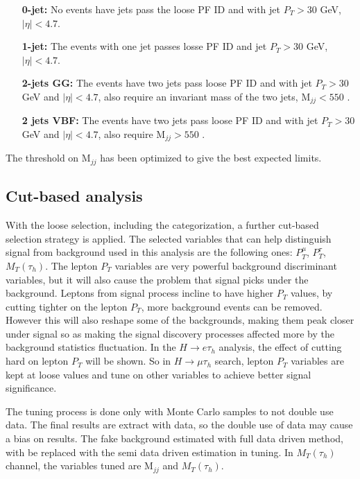 \begin{enumerate}
\item[{\bf 0-jet:}] No events have jets pass the loose PF ID and  with jet $P_T>30$ GeV, $|\eta|<4.7$.
\item[{\bf 1-jet:}] The events with one jet passes losse PF ID and jet $P_T>30$ GeV, $|\eta|<4.7$.
\item [{\bf 2-jets GG:}] The events have two jets pass loose PF ID and with jet $P_T>30$ GeV and $|\eta|<4.7$, also require an invariant mass of the two jets, $\textrm{M}_{jj}<550$ \GeV. 
\item [{\bf 2 jets VBF:}] The events have two jets pass loose PF ID and with jet $P_T>30$ GeV and $|\eta|<4.7$, also require $\textrm{M}_{jj}>550$ \GeV. 
\end{enumerate} The threshold on $\textrm{M}_{jj}$ has been optimized to give the best expected limits.


\subsection{Cut-based analysis}
With the loose selection, including the categorization, a further cut-based selection strategy is applied. The selected variables that can help distinguish signal from background used in this analysis are the following ones: $P_{T}^{\mu}$, $P_{T}^{\tau}$, $M_{T}(\tau_{h})$. The lepton $P_{T}$ variables are very powerful background discriminant variables, but it will also cause the problem that signal picks under the background. Leptons from signal process  incline to have higher $P_{T}$ values, by cutting tighter on the lepton $P_{T}$, more background events can be removed. However this will also reshape some of the backgrounds, making them peak closer under signal so as making the signal discovery processes affected more by the background statistics fluctuation. In the $H\rightarrow e\tau_h$ analysis, the effect of cutting hard on lepton $P_{T}$ will be shown. So in $H\rightarrow\mu\tau_h$ search, lepton $P_{T}$ variables are kept at loose values and tune on other variables to achieve better signal significance. 

The tuning process is done only with Monte Carlo samples to not double use data. The final results are extract with data, so the double use of data may cause a bias on results. The fake background estimated with full data driven method, with be replaced with the semi data driven estimation in tuning.  
In $M_{T}(\tau_{h})$  channel,  the variables tuned are $\textrm{M}_{jj}$ and $M_{T}(\tau_{h})$.

